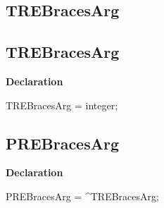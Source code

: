 \documentclass{report}
\newif\ifpdf
\begin{document}
\subsection*{\large{\textbf{TREBracesArg}}\normalsize\hspace{1ex}\hrulefill}
\else
\subsection*{TREBracesArg}
\fi
\label{RegExpr-TREBracesArg}
\begin{list}{}{
\setlength{\itemindent}{0cm}
\setlength{\listparindent}{0cm}
\setlength{\leftmargin}{\evensidemargin}
\addtolength{\leftmargin}{\tmplength}
\settowidth{\labelsep}{X}
\addtolength{\leftmargin}{\labelsep}
\setlength{\labelwidth}{\tmplength}
}
\item[\textbf{Declaration}\hfill]
\ifpdf
\begin{flushleft}
\fi
\begin{ttfamily}
TREBracesArg = integer;\end{ttfamily}

\ifpdf
\end{flushleft}
\fi

\end{list}
\ifpdf
\subsection*{\large{\textbf{PREBracesArg}}\normalsize\hspace{1ex}\hrulefill}
\else
\subsection*{PREBracesArg}
\fi
\label{RegExpr-PREBracesArg}
\begin{list}{}{
\setlength{\itemindent}{0cm}
\setlength{\listparindent}{0cm}
\setlength{\leftmargin}{\evensidemargin}
\addtolength{\leftmargin}{\tmplength}
\settowidth{\labelsep}{X}
\addtolength{\leftmargin}{\labelsep}
\setlength{\labelwidth}{\tmplength}
}
\item[\textbf{Declaration}\hfill]
\ifpdf
\begin{flushleft}
\fi
\begin{ttfamily}
PREBracesArg = {\^{}}TREBracesArg;\end{ttfamily}

\ifpdf
\end{flushleft}
\fi

\end{list}
\ifpdf
\end{document}
